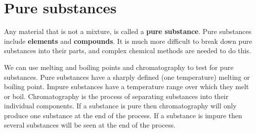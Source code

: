             \section{Pure substances}
            \nopagebreak
      \label{m38708*id63273}Any material that is not a mixture, is called a \textbf{pure substance}. Pure substances include \textbf{elements} and \textbf{compounds}. It is much more difficult to break down pure substances into their parts, and complex chemical methods are needed to do this.\par 
{} 
      \label{m38708*eip-862}We can use melting and boiling points and chromatography to test for pure substances. Pure substances have a sharply defined (one temperature) melting or boiling point. Impure substances have a temperature range over which they melt or boil.  Chromatography is the process of separating substances into their individual components. If a substance is pure then chromatography will only produce one substance at the end of the process. If a substance is impure then several substances will be seen at the end of the process.  \label{m38708*eip-122}
